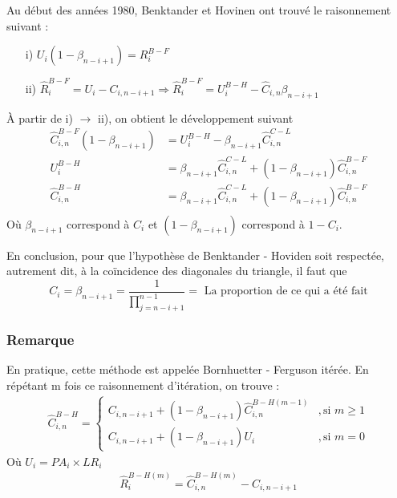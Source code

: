 \documentclass[11pt,french]{report}
\begin{document}
Au début des années 1980, Benktander et Hovinen ont trouvé le raisonnement suivant :
\begin{itemize}
\item[i)] $U_i (1 - \beta_{n-i+1}) = R_i^{B-F}$
\item[ii)] $\widehat{R}_i^{B-F} = U_i - C_{i,n-i+1} \Rightarrow \widehat{R}_i^{B-F} = U_i^{B-H} - \widehat{C}_{i,n}\beta_{n-i+1}$
\end{itemize}
À partir de i) $\rightarrow$ ii), on obtient le développement suivant
\begin{align*}
\widehat{C}_{i, n}^{B-F} ( 1 - \beta_{n-i+1} )  &= U_i ^{B-H} - \beta_{n-i+1} \widehat{C}_{i, n}^{C-L} \\
U_i ^{B-H} &= \beta_{n-i+1} \widehat{C}_{i, n}^{C-L} + ( 1 - \beta_{n-i+1} )\widehat{C}_{i, n}^{B-F}  \\
\widehat{C}_{i,n}^{B-H} &= \beta_{n-i+1} \widehat{C}_{i, n}^{C-L} + ( 1 - \beta_{n-i+1} )\widehat{C}_{i, n}^{B-F}  \\
\end{align*}
Où $\beta_{n-i+1}$ correspond à $C_i$ et $( 1 - \beta_{n-i+1} )$ correspond à $ 1 - C_i$.
\newline

En conclusion, pour que l'hypothèse de Benktander - Hoviden soit respectée, autrement dit, à la coïncidence  des diagonales du triangle,  il faut que 
\begin{equation}
C_i = \beta_{n-i+1} = \frac{1}{\prod_{j=n-i+1}^{n-1}} = \text{ La proportion de ce qui a été fait}
\end{equation}

\subsubsection*{Remarque}
En pratique, cette méthode est appelée Bornhuetter - Ferguson itérée. \newline
En répétant  m fois ce raisonnement d'itération, on trouve :
\begin{align*}
 \widehat{C}_{i,n}^{B-H} =
     	\left\{
     	\begin{array}{rl}
     	C_{i,n-i+1} + ( 1 - \beta_{n-i+1} )\widehat{C}_{i, n}^{B-H (m-1)} &, \text{si } m \geq 1 \\
		  C_{i,n-i+1} + ( 1 - \beta_{n-i+1} )U_i &, \text{si } m = 0
     	\end{array}
     	\right.
\end{align*}
Où $U_i = PA_i \times LR_i$
\begin{align*}
\widehat{R}_i^{B-H(m)} = \widehat{C}_{i, n}^{B-H (m)} - C_{i,n-i+1}
\end{align*}
\end{document}
